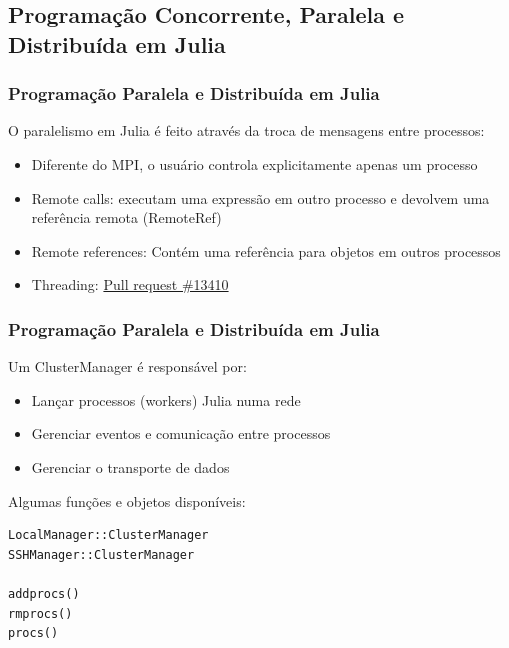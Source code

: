 \documentclass[10pt, compress]{beamer}
\begin{document}
\subsection{Programação Concorrente, Paralela e Distribuída em Julia}

\begin{frame}[fragile]
    \frametitle{Programação Paralela e Distribuída em Julia}
    O paralelismo em Julia é feito através da troca de mensagens
    entre processos:
    \begin{itemize}
        \item Diferente do MPI, o usuário controla
            explicitamente \alert{apenas um processo}
            \pause
        \item \alert{Remote calls}: executam uma \alert{expressão} em
            outro processo e devolvem uma referência remota (\alert{RemoteRef})
            \pause
        \item \alert{Remote references}: Contém uma referência para objetos
            em \alert{outros processos}
            \pause
        \item \alert{Threading}: \href{https://github.com/JuliaLang/julia/pull/13410}{Pull request \#13410}
    \end{itemize}
    \let\thefootnote\relax{}
    \let\thefootnote\relax{}
\end{frame}

\begin{frame}[fragile]
    \frametitle{Programação Paralela e Distribuída em Julia}
    Um \alert{ClusterManager} é responsável por:
    \begin{itemize}
        \item Lançar processos (\alert{workers}) Julia numa rede
            \pause
        \item Gerenciar \alert{eventos} e \alert{comunicação}
            entre processos
            \pause
        \item Gerenciar o \alert{transporte} de dados
    \end{itemize}
    \pause
    Algumas funções e objetos disponíveis:
    \begin{lstlisting}
LocalManager::ClusterManager
SSHManager::ClusterManager

addprocs()
rmprocs()
procs()
    \end{lstlisting}
    \let\thefootnote\relax{}
    \let\thefootnote\relax{}
\end{frame}
\end{document}
